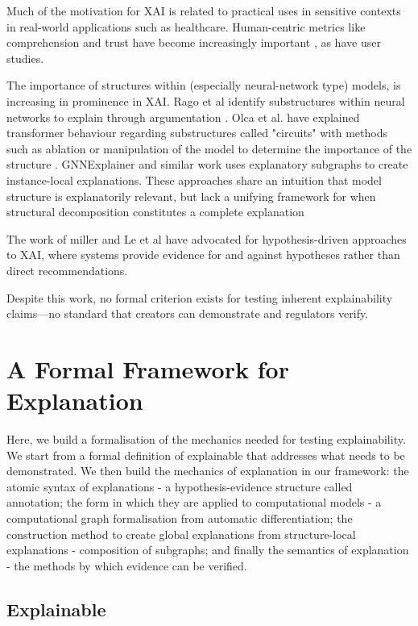 \documentclass{article}
\begin{document}
Much of the motivation for XAI is related to practical uses in sensitive contexts in real-world applications such as healthcare. Human-centric metrics like comprehension and trust have become increasingly important \cite{rago2018argumentation,merry2021mental}, as have user studies.

The importance of structures within (especially neural-network type) models, is increasing in prominence in XAI. Rago et al identify substructures within neural networks to explain through argumentation \cite{rago2018argumentation}. Olca et al. have explained transformer behaviour regarding substructures called "circuits" with methods such as ablation or manipulation of the model to determine the importance of the structure \cite{olah2020zoom}. GNNExplainer \cite{ying2019gnnexplainer} and similar work uses explanatory subgraphs to create instance-local explanations. These approaches share an intuition that model structure is explanatorily relevant, but lack a unifying framework for when structural decomposition constitutes a complete explanation

The work of miller \cite{miller2023evaluative} and Le et al \cite{le2024evaluative} have advocated for hypothesis-driven approaches to XAI, where systems provide evidence for and against hypotheses rather than direct recommendations. 

Despite this work, no formal criterion exists for testing inherent explainability claims—no standard that creators can demonstrate and regulators verify.

\section{A Formal Framework for Explanation}

Here, we build a formalisation of the mechanics needed for testing explainability. We start from a formal definition of explainable that addresses what needs to be demonstrated. We then build the mechanics of explanation in our framework: the atomic syntax of explanations - a hypothesis-evidence structure called annotation; the form in which they are applied to computational models - a computational graph formalisation from automatic differentiation; the construction method to create global explanations from structure-local explanations - composition of subgraphs; and finally the semantics of explanation - the methods by which evidence can be verified.

\subsection{Explainable}
\end{document}
